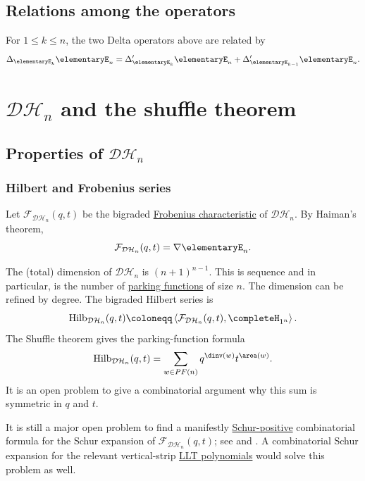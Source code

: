 \subsection[dhOperators]{Relations among the operators}

For \(1\leq k\leq n\), the two Delta operators above are related by
\cite{HaglundRemmelWilson2018}
\[
 \Delta_{\elementaryE_k} \elementaryE_n =
 \Delta'_{\elementaryE_k} \elementaryE_n +
 \Delta'_{\elementaryE_{k-1}} \elementaryE_n.
\]




\section[dhShuffle]{$\mathcal{DH}_n$ and the shuffle theorem}


\subsection[dhShuffleProps]{Properties of $\mathcal{DH}_n$}

\subsubsection[diagonalCoinvariantHilbertFrobenius]{Hilbert and Frobenius series}

Let \(\mathcal{F}_{\mathcal{DH}_n}(q,t)\) be the bigraded
\hyperref[frobeniusCharacteristic]{Frobenius characteristic} of
\(\mathcal{DH}_n\).  By Haiman's theorem,
\[
 \mathcal{F}_{\mathcal{DH}_n}(q,t)=\nabla \elementaryE_n.
\]

The (total) dimension of $\mathcal{DH}_n$ is $(n+1)^{n-1}$.
This is sequence  and in particular,
is the number of \hyperref[parkingFunctions]{parking functions} of size $n$.
The dimension can be refined by degree.  The bigraded Hilbert series is
\[
 \mathrm{Hilb}_{\mathcal{DH}_n}(q,t)
 \coloneqq
 \left\langle \mathcal{F}_{\mathcal{DH}_n}(q,t), \completeH_{1^n} \right\rangle.
\]
The Shuffle theorem gives the parking-function formula
\[
\mathrm{Hilb}_{\mathcal{DH}_n}(q,t)
= \sum_{w \in PF(n)} q^{\dinv(w)} t^{\area(w)}.
\]
It is an open problem to give a combinatorial argument why this sum is
symmetric in $q$ and $t$.

It is still a major open problem to find a manifestly
\hyperref[schurPositiveDefinition]{Schur-positive}
combinatorial formula for the Schur expansion of
\(\mathcal{F}_{\mathcal{DH}_n}(q,t)\); see
\cite[Prob.~2.15]{qtCatalanBook} and \cite[Sec.~3]{vanWilligenburg2019}.
A combinatorial Schur expansion for the relevant vertical-strip
\hyperref[LLT]{LLT polynomials} would solve this problem as well.

